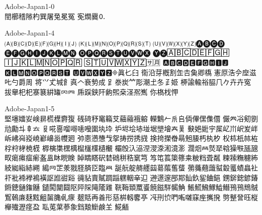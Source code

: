 %
%
%
%


Adobe-Japan1-0\\
𨳝櫛𥡴𨻶杓巽屠兔冕冤
𡨚𤏐爨🄀

Adobe-Japan1-4\\
🄐🄑🄒🄓🄔🄕🄖🄗🄘🄙
🄚🄛🄜🄝🄞🄟🄠🄡🄢🄣
🄤🄥🄦🄧🄨🄩🅐🅑🅒🅓
🅔🅕🅖🅗🅘🅙🅚🅛🅜🅝
🅞🅟🅠🅡🅢🅣🅤🅥🅦🅧
🅨🅩🄰🄱🄲🄳🄴🄵🄶🄷
🄸🄹🄺🄻🄼🄽🄾🄿🅀🅁
🅂🅃🅄🅅🅆🅇🅈🅉🈂🈷
🅰🅱🅲🅳🅴🅵🅶🅷🅸🅹
🅺🅻🅼🅽🅾🅿🆀🆁🆂🆃
🆄🆅🆆🆇🆈🆉🞜眞𠤎𦥑
𫟘沿芽槪割𦈢𠮷𩵋卿𫞎
憲𠩤浩𫝆𫝷滋𠮟勺爵周
将𭕄𠀋城𩙿真𠆢𮕩𫝑成
𧾷𣳾炭𥫗彫潮𡈽冬𤴔姬
𫞉諭輸𥙿𦚰𠘨𠂊𠦄卉寃
拔𦦙𣏌杞𪧦𫞽絣𮉸𠔿𦉪
𠂰𮛪𨦇𨸗𫠚𤋮桒𣲾𠘑嶲
你𣘺𣏾𢘉

Adobe-Japan1-5\\
𡌛𡑮𡢽𡚴𡸴𣇄𣗄𣜿𣝣𤟱
𥒎𥔎𥝱𥧄𥶡𦫿𦹀𧃴𧚄𨉷
𨏍𪆐𠂉𠂢𠂤𠈓𠌫𠎁𠍱𠏹
𠑊𠔉𠗖𠝏𠠇𠠺𠢹𠥼𠦝𠫓
𠬝𠵅𠷡𠺕𠹭𠹤𠽟𡈁𡉕𡉻
𡉴𡋤𡋗𡋽𡌶𡍄𡏄𡑭𡗗𦰩
𡙇𡜆𡝂𡧃𡱖𡴭𡵅𡵸𡵢𡶡
𡶜𡶒𡶷𡷠𡸳𡼞𡽶𡿺𢅻𢌞
𢎭𢛳𢡛𢢫𢦏𢪸𢭏𢭐𢭆𢰝
𢮦𢰤𢷡𣇃𣇵𣆶𣍲𣏓𣏒𣏐
𣏤𣏕𣏚𣏟𣑊𣑑𣑋𣑥𣓤𣕚
𣖔𣘹𣙇𣘸𣜜𣜌𣝤𣟿𣟧𣠤
𣠽𣪘𣱿𣴀𣵀𣷺𣷹𣷓𣽾𤂖
𤄃𤇆𤇾𤎼𤘩𤚥𤢖𤩍𤭖𤭯
𤰖𤸎𤸷𤹪𤺋𥁊𥁕𥄢𥆩𥇥
𥇍𥈞𥉌𥐮𥓙𥖧𥞩𥞴𥧔𥫤
𥫣𥫱𥮲𥱋𥱤𥸮𥹖𥹥𥹢𥻘
𥻂𥻨𥼣𥽜𥿠𥿔𦀌𥿻𦀗𦁠
𦃭𦉰𦊆𣴎𦐂𦙾𦜝𦣝𦣪𦥯
𦧝𦨞𦩘𦪌𦪷𦱳𦳝𦹥𦾔𦿸
𦿶𦿷𧄍𧄹𧏛𧏚𧏾𧐐𧑉𧘕
𧘔𧘱𧚓𧜎𧜣𧝒𧦅𧪄𧮳𧮾
𧯇𧲸𧶠𧸐𨂊𨂻𨊂𨋳𨐌𨑕
𨕫𨗈𨗉𨛗𨛺𨥉𨥆𨥫𨦈𨦺
𨦻𨨞𨨩𨩱𨩃𨪙𨫍𨫤𨫝𨯁
𨯯𨴐𨵱𨷻𨸟𨸶𨺉𨻫𨼲𨿸
𩊠𩊱𩒐𩗏𩛰𩜙𩝐𩣆𩩲𩷛
𩸕𩺊𩹉𩻄𩻩𩻛𩿎𩿗𪀯𪀚
𪃹𪂂𢈘𪎌𪐷𪗱𪘂𪚲𠃵𤸄
𤿲𧵳再善形慈栟軔𪊲𠅘
𠖱𠛬𫝓𠵘𫝚𫝜𥧌𫝶𢹂𫝼
𠟈𢿫𧦴𫞂𫞋𣟱𫞔𤁋𫞬𫞯
𫟉𫟏𫟒𦲞𧰼𫟰𫝥𫠍𫠗𦍌
𩸽𪘚

